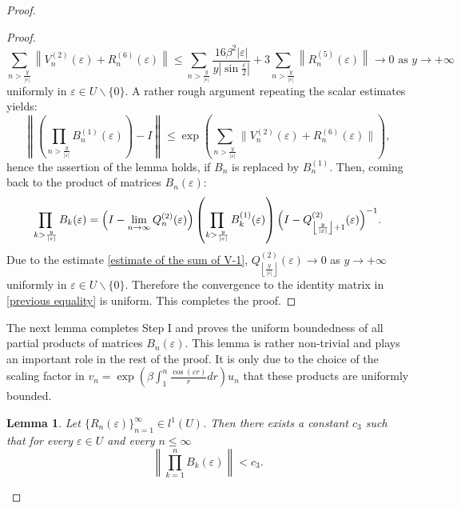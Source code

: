 \documentclass[a4paper,oneside,12pt]{amsart}
\newtheorem{lem}{Lemma}
\begin{document}
\begin{proof}
\begin{proof}
\begin{equation*}
    \sum_{n>\frac y{|\varepsilon|}}\left\|V^{(2)}_n(\varepsilon)+R^{(6)}_n(\varepsilon)\right\|
    \le\sum_{n>\frac y{|\varepsilon|}}\frac{16\beta^2|\varepsilon|}{y\left|\sin\frac{\varepsilon}2\right|}+3\sum_{n>\frac y{|\varepsilon|}}\left\|R^{(5)}_n(\varepsilon)\right\|
    \rightarrow0\text{ as }y\rightarrow+\infty
\end{equation*}
uniformly in $\varepsilon\in U\backslash\{0\}$. A rather rough argument repeating the scalar estimates yields:
\begin{equation*}
    \left\|\left(\prod_{n>\frac y{|\varepsilon|}}B^{(1)}_n(\varepsilon)\right)-I\right\|
    \le\exp\left(\sum_{n>\frac y{|\varepsilon|}}\|V^{(2)}_n(\varepsilon)+R^{(6)}_n(\varepsilon)\|\right),
\end{equation*}
hence the assertion of the lemma holds, if $B_n$ is replaced by $B^{(1)}_n$. Then, coming back to the product of matrices $B_n(\varepsilon)$:
\begin{equation}\label{previous equality}
    \prod_{k>\frac y{|\varepsilon|}}B_k(\varepsilon)=\Bigl(I-\lim\limits_{n\rightarrow\infty}Q^{(2)}_n(\varepsilon)\Bigr)
    \left(\prod_{k>\frac y{|\varepsilon|}}B^{(1)}_k(\varepsilon)\right)
    \Bigl(I-Q^{(2)}_{\left\lfloor\frac{y}{|\varepsilon|}\right\rfloor+1}(\varepsilon)\Bigr)^{-1}.
\end{equation}
Due to the estimate \eqref{estimate of the sum of V-1}, $Q^{(2)}_{\left\lfloor\frac{y}{|\varepsilon|}\right\rfloor}(\varepsilon)\rightarrow0$ as $y\rightarrow+\infty$ uniformly in $\varepsilon\in U\backslash\{0\}$. Therefore the convergence to the identity matrix in \eqref{previous equality} is uniform. This completes the proof.
\end{proof}

The next lemma completes Step I and proves the uniform boundedness of all partial products of matrices $B_n(\varepsilon)$. This lemma is rather non-trivial and plays an important role in the rest of the proof. It is only due to the choice of the scaling factor in $v_n=\exp\left(\beta\int_1^n\frac{\cos(\varepsilon r)}rdr\right)u_n$ that these products are uniformly bounded.

    \begin{lem}\label{lem a priori estimate}
    Let $\{R_n(\varepsilon)\}_{n=1}^{\infty}\in l^1(U)$. Then there exists a constant $c_3$ such that for every $\varepsilon\in U$ and every $n\le\infty$
    \begin{equation}\label{a priori estimate}
        \left\|\prod_{k=1}^nB_k(\varepsilon)\right\|<c_3.
    \end{equation}
    \end{lem}


\end{proof}
\end{document}
